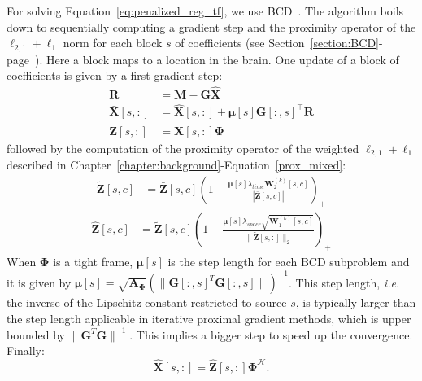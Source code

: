 For solving Equation~\eqref{eq:penalized_reg_tf}, we use BCD~\cite{tseng}. The algorithm boils down to sequentially computing a gradient step and the proximity operator of the $\ell_{2,1}+\ell_1$ norm for each block $s$ of coefficients (see Section~\ref{section:BCD}-page~\pageref{section:BCD}). Here a block maps to a location in the brain. One update of a block of coefficients is given by a first gradient step:
\begin{align} \label{eq:block_update}
    \mathbf{R} &= \mathbf{M} - \mathbf{G}\hat{\mathbf{X}} \\
    \bar{\mathbf{X}}[s,:] &= \hat{\mathbf{X}}[s,:] + \mathbf{\mu}[s]\mathbf{G}[:,s]^\top\mathbf{R} \\
    \bar{\mathbf{Z}}[s,:] &= \bar{\mathbf{X}}[s,:]\mathbf{\Phi}
\end{align}
followed by the computation of the proximity operator of the weighted $\ell_{2,1}+\ell_1$ described in Chapter~\ref{chapter:background}-Equation~\eqref{prox_mixed}:
\begin{equation} \label{prox_l1}
\begin{aligned}
    \tilde{\mathbf{Z}}[s,c] &= \bar{\mathbf{Z}}[s,c]\left(1 - \frac{\mathbf{\mu}[s]\lambda_{time}\mathbf{W}_2^{(k)}[s,c]}{|\bar{\mathbf{Z}}[s,c]|} \right)_+
\end{aligned}
\end{equation}
\begin{equation} \label{prox_l21}
\begin{aligned}
    \hat{\mathbf{Z}}[s,c] &= \tilde{\mathbf{Z}}[s,c]\left(1 - \frac{\mathbf{\mu}[s]\lambda_{space}\sqrt{\mathbf{W}_1^{(k)}[s,c]}}{\|\tilde{\mathbf{Z}}[s,:]\|_2}\right)_+
\end{aligned}
\end{equation}
When $\mathbf{\Phi}$ is a tight frame, $\mathbf{\mu}[s]$ is the step length for each BCD subproblem and it is given by $\mathbf{\mu}[s]=\sqrt{\mathbf{A}_{\mathbf{\Phi}}}(\|\mathbf{G}[:,s]^T\mathbf{G}[:,s]\|)^{-1}$. This step length, \textit{i.e.} the inverse of the Lipschitz constant restricted to source $s$, is typically larger than the step length applicable in iterative proximal gradient methods, which is upper bounded by $\|\mathbf{G}^T\mathbf{G}\|^{-1}$. This implies a bigger step to speed up the convergence.
Finally:
\begin{equation}
    \hat{\mathbf{X}}[s,:] = \hat{\mathbf{Z}}[s,:]\mathbf{\Phi}^\mathcal{H}.
\end{equation}

